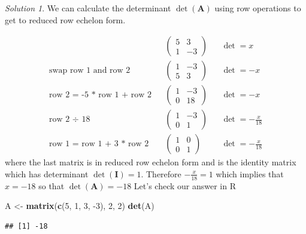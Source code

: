 \documentclass[
]{book}
\newenvironment{Shaded}{\begin{snugshade}}{\end{snugshade}}
\newcommand{\DecValTok}[1]{\textcolor[rgb]{0.00,0.00,0.81}{#1}}
\newcommand{\KeywordTok}[1]{\textcolor[rgb]{0.13,0.29,0.53}{\textbf{#1}}}
\newcommand{\NormalTok}[1]{#1}
\newcommand{\StringTok}[1]{\textcolor[rgb]{0.31,0.60,0.02}{#1}}
\theoremstyle{definition}
\theoremstyle{definition}
\theoremstyle{definition}
\theoremstyle{remark}
\newtheorem*{solution}{Solution}
\begin{document}
\begin{solution}

We can calculate the determinant \(\operatorname{det}(\mathbf{A})\) using row operations to get to reduced row echelon form.

\[
\begin{aligned}
&& \begin{pmatrix} 5 & 3 \\ 1 & -3 \end{pmatrix} && \operatorname{det} = x \\
\mbox{swap row 1 and row 2} && \begin{pmatrix} 1 & -3 \\ 5 & 3  \end{pmatrix} && \operatorname{det} = -x \\
\mbox{row 2 = -5 * row 1 + row 2} && \begin{pmatrix} 1 & -3 \\ 0 & 18  \end{pmatrix} && \operatorname{det} = -x \\
\mbox{row 2 } \div \mbox{ 18} && \begin{pmatrix} 1 & -3 \\ 0 & 1  \end{pmatrix} && \operatorname{det} = -\frac{x}{18} \\
\mbox{row 1 = row 1 + 3 * row 2} && \begin{pmatrix} 1 & 0 \\ 0 & 1  \end{pmatrix} && \operatorname{det} = -\frac{x}{18} 
\end{aligned}
\]
where the last matrix is in reduced row echelon form and is the identity matrix which has determinant \(\operatorname{det}(\mathbf{I}) = 1\). Therefore \(-\frac{x}{18} = 1\) which implies that \(x = -18\) so that \(\operatorname{det}(\mathbf{A}) = -18\)
Let's check our answer in R

\begin{Shaded}
\begin{Highlighting}[]
\NormalTok{A <-}\StringTok{ }\KeywordTok{matrix}\NormalTok{(}\KeywordTok{c}\NormalTok{(}\DecValTok{5}\NormalTok{, }\DecValTok{1}\NormalTok{, }\DecValTok{3}\NormalTok{, }\DecValTok{-3}\NormalTok{), }\DecValTok{2}\NormalTok{, }\DecValTok{2}\NormalTok{)}
\KeywordTok{det}\NormalTok{(A)}
\end{Highlighting}
\end{Shaded}

\begin{verbatim}
## [1] -18
\end{verbatim}

\end{solution}
\end{document}
